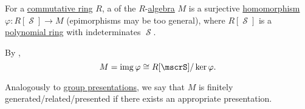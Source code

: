 \begin{definition}\label{def:algebra_presentation}
  For a \hyperref[def:commutative_ring]{commutative ring} \( R \), a  of the \( R \)-\hyperref[def:algebra_over_ring]{algebra} \( M \) is a surjective \hyperref[def:module/homomorphism]{homomorphism} \( \varphi: R[\mscrS] \to M \) (epimorphisms may be too general), where \( R[\mscrS] \) is a \hyperref[def:polynomial_semiring]{polynomial ring} with indeterminates \( \mscrS \).

  By ,
  \begin{equation*}
    M = \img \varphi \cong R[\mscrS] / \ker \varphi.
  \end{equation*}

  Analogously to \hyperref[def:group_presentation]{group presentations}, we say that \( M \) is finitely generated/related/presented if there exists an appropriate presentation.
\end{definition}

